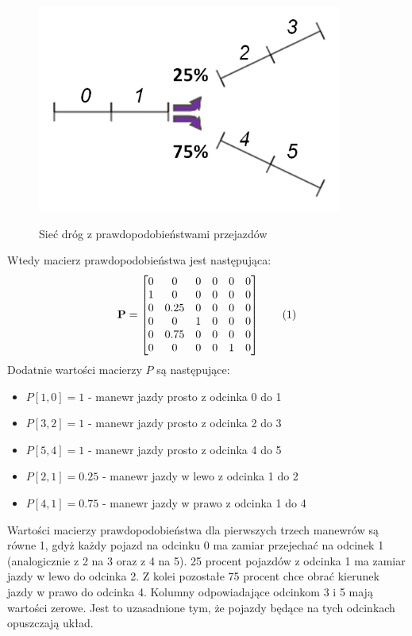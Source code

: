 \documentclass[12pt]{book}
\theoremstyle{plain}
\newcommand\cincludegraphics[2][]{\raisebox{-0.5\height}{\texttt{[image: \#2]}}}
\newcommand\addtag{\refstepcounter{equation}
\renewcommand{\labelenumii}{\theenumii}
\renewcommand{\theenumii}{\theenumi.\arabic{enumii}.}
\tag{\theequation}}
\begin{document}
\begin{figure}[H]
	\centering
	\includegraphics[width=10cm]{images/env_11_perc_italic}
	\label{fig:env_11}
	\caption{Sieć dróg z prawdopodobieństwami przejazdów}
\end{figure}

\noindent Wtedy macierz prawdopodobieństwa jest następująca:
\def \P {\begin{bmatrix}
		0 & 0 & 0 & 0 & 0 & 0 \\
		1 & 0 & 0 & 0 & 0 & 0 \\
		0 & 0.25 & 0 & 0 & 0 & 0 \\
		0 & 0 & 1 & 0 & 0 & 0 \\
		0 & 0.75 & 0 & 0 & 0 & 0 \\
		0 & 0 & 0 & 0 & 1 & 0 
\end{bmatrix}}
\[\textbf{P}=\P \addtag \label{eq:p_example} \]
Dodatnie wartości macierzy $P$ są następujące:
\begin{itemize}
	\item $P[1,0]=1$ - manewr jazdy prosto z odcinka 0 do 1
	\item $P[3,2]=1$ - manewr jazdy prosto z odcinka 2 do 3
	\item $P[5,4]=1$ - manewr jazdy prosto z odcinka 4 do 5
	\item $P[2,1]=0.25$ - manewr jazdy w lewo z odcinka 1 do 2
	\item $P[4,1]=0.75$ - manewr jazdy w prawo z odcinka 1 do 4
\end{itemize}
Wartości macierzy prawdopodobieństwa dla pierwszych trzech manewrów są równe 1, gdyż każdy pojazd na odcinku 0 ma zamiar przejechać na odcinek 1 (analogicznie z 2 na 3 oraz z 4 na 5). 25 procent pojazdów z odcinka 1 ma zamiar jazdy w lewo do odcinka 2. Z kolei pozostałe 75 procent chce obrać kierunek jazdy w prawo do odcinka 4. Kolumny odpowiadające odcinkom 3 i 5 mają wartości zerowe. Jest to uzasadnione tym, że pojazdy będące na tych odcinkach opuszczają układ.
\end{document}
